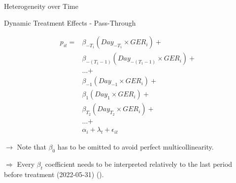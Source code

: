 \begin{frame}{Heterogeneity over Time}






\vspace{-0.7cm}


\begin{block}{Dynamic Treatment Effects - Pass-Through}

\vspace{-0.2cm}

\footnotesize

\begin{equation}
\begin{aligned}
\label{eq:Dynamic_DiD_long}
p_{it} = & \beta_{-T_{1}} (Day_{-T_{1}} \times GER_{i}) + \\
& \beta_{-(T_{1}-1)} (Day_{-(T_{1}-1)} \times GER_{i}) + \\
& \text{…} + \\
& \beta_{-1} (Day_{-1} \times GER_{i}) + \\
& \beta_{1} (Day_{1} \times GER_{i}) + \\
& \beta_{T_{2}} (Day_{T_{2}} \times GER_{i}) + \\
& \text{…} + \\
& \alpha_{i} + \lambda_{t} + \epsilon_{it}
\end{aligned}
\end{equation}


$\longrightarrow$ Note that $\beta_{0}$ has to be omitted to avoid perfect multicollinearity. 

$\Longrightarrow$ Every $\beta_{t}$ coefficient needs to be interpreted relatively to the last period before treatment (2022-05-31) (\cite{Huntington2022}).




\end{block}






    
\end{frame}











